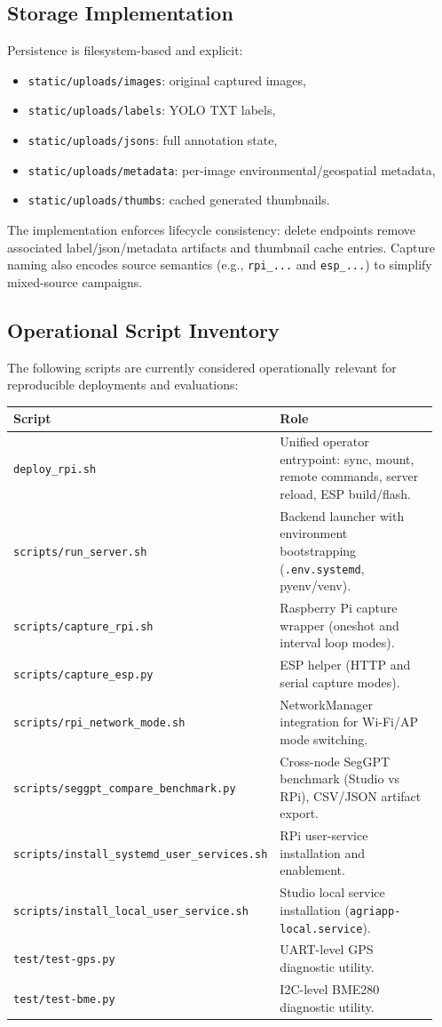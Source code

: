 \subsection{Storage Implementation}
Persistence is filesystem-based and explicit:
\begin{itemize}
  \item \texttt{static/uploads/images}: original captured images,
  \item \texttt{static/uploads/labels}: YOLO TXT labels,
  \item \texttt{static/uploads/jsons}: full annotation state,
  \item \texttt{static/uploads/metadata}: per-image environmental/geospatial metadata,
  \item \texttt{static/uploads/thumbs}: cached generated thumbnails.
\end{itemize}

The implementation enforces lifecycle consistency: delete endpoints remove associated label/json/metadata artifacts and thumbnail cache entries. Capture naming also encodes source semantics (e.g., \texttt{rpi\_...} and \texttt{esp\_...}) to simplify mixed-source campaigns.

\subsection{Operational Script Inventory}
The following scripts are currently considered operationally relevant for reproducible deployments and evaluations:
\begin{longtable}{p{0.28\linewidth} p{0.67\linewidth}}
\toprule
Script & Role \\
\midrule
\texttt{deploy\_rpi.sh} & Unified operator entrypoint: sync, mount, remote commands, server reload, ESP build/flash. \\
\texttt{scripts/run\_server.sh} & Backend launcher with environment bootstrapping (\texttt{.env.systemd}, pyenv/venv). \\
\texttt{scripts/capture\_rpi.sh} & Raspberry Pi capture wrapper (oneshot and interval loop modes). \\
\texttt{scripts/capture\_esp.py} & ESP helper (HTTP and serial capture modes). \\
\texttt{scripts/rpi\_network\_mode.sh} & NetworkManager integration for Wi-Fi/AP mode switching. \\
\texttt{scripts/seggpt\_compare\_benchmark.py} & Cross-node SegGPT benchmark (Studio vs RPi), CSV/JSON artifact export. \\
\texttt{scripts/install\_systemd\_user\_services.sh} & RPi user-service installation and enablement. \\
\texttt{scripts/install\_local\_user\_service.sh} & Studio local service installation (\texttt{agriapp-local.service}). \\
\texttt{test/test-gps.py} & UART-level GPS diagnostic utility. \\
\texttt{test/test-bme.py} & I2C-level BME280 diagnostic utility. \\
\bottomrule
\end{longtable}

